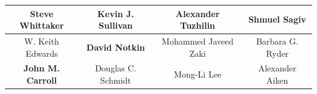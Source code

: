 \documentclass{sig-alternate-10pt}
\begin{document}
\begin{table}[t]
{\begin{scriptsize}
\begin{tabular}{|c|c|c|c|}
\textbf{Steve Whittaker} & Kevin J. Sullivan & Alexander Tuzhilin & Shmuel Sagiv\\ \hline
W. Keith Edwards & \textbf{David Notkin} & Mohammed Javeed Zaki & Barbara G. Ryder\\ \hline
\textbf{John M. Carroll} & Douglas C. Schmidt & Mong-Li Lee & Alexander Aiken\\ \hline
\end{tabular}
\end{scriptsize}
}
\label{tab:authors_frequency_core_community1}
\end{table}
\end{document}
